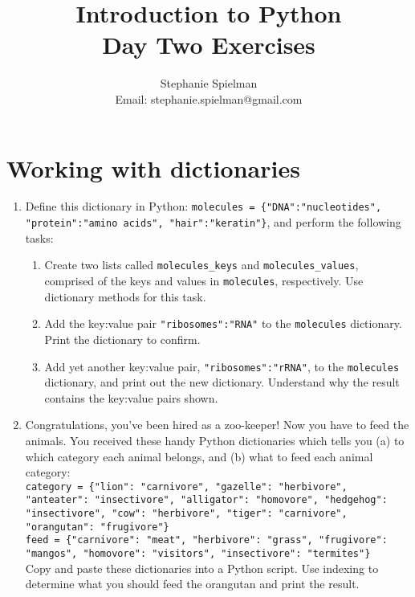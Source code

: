 \documentclass{article}[12pt]
\newcommand{\code}[1]{\texttt{#1}}  %
\begin{document}
\title{Introduction to Python \\ Day Two Exercises}
\author{Stephanie Spielman \\ \footnotesize{Email: stephanie.spielman@gmail.com}}
\date{}
\maketitle{}

\section{Working with dictionaries}

\begin{enumerate}[itemsep=5ex]
	
	\item Define this dictionary in Python: \code{molecules = \{"DNA":"nucleotides", "protein":"amino acids", "hair":"keratin"\}}, and perform the following tasks:
	\begin{enumerate}[itemsep=2ex]
		\item Create two lists called \code{molecules\_keys} and \code{molecules\_values}, comprised of the keys and values in \code{molecules}, respectively. Use dictionary methods for this task.
		\item Add the key:value pair \code{"ribosomes":"RNA"} to the \code{molecules} dictionary. Print the dictionary to confirm.
		\item Add yet another key:value pair, \code{"ribosomes":"rRNA"}, to the \code{molecules} dictionary, and print out the new dictionary. Understand why the result contains the key:value pairs shown.
	\end{enumerate}
	
	
	\item Congratulations, you've been hired as a zoo-keeper! Now you have to feed the animals. You received these handy Python dictionaries which tells you (a) to which category each animal belongs, and (b) what to feed each animal category: \\
	
	\code{category = \{"lion": "carnivore", "gazelle": "herbivore", "anteater": "insectivore", "alligator": "homovore", "hedgehog": "insectivore", "cow": "herbivore", "tiger": "carnivore", "orangutan": "frugivore"\}} \\
	
	\code{feed = \{"carnivore": "meat", "herbivore": "grass", "frugivore": "mangos", "homovore": "visitors", "insectivore": "termites"\} } \\
	
	\noindent Copy and paste these dictionaries into a Python script. Use indexing to determine what you should feed the orangutan and print the result.
	

\end{enumerate}
\end{document}
